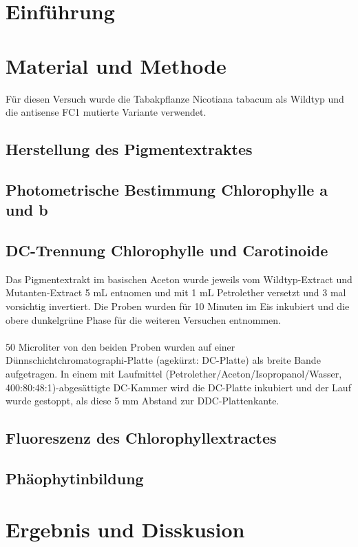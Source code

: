 \documentclass[10pt,a4paper]{article}
\begin{document}
	
	\section{Einführung}
	

	
	\section{Material und Methode}
	Für diesen Versuch wurde die Tabakpflanze Nicotiana tabacum als Wildtyp und die antisense FC1 mutierte Variante verwendet.
		\subsection{Herstellung des Pigmentextraktes}
		\subsection{Photometrische Bestimmung Chlorophylle a und b}
		\subsection{DC-Trennung Chlorophylle und Carotinoide}
		Das Pigmentextrakt im basischen Aceton wurde jeweils vom Wildtyp-Extract und Mutanten-Extract 5 mL entnomen und mit 1 mL Petrolether versetzt und 3 mal vorsichtig invertiert.
		Die Proben wurden für 10 Minuten im Eis inkubiert und die obere dunkelgrüne Phase für die weiteren Versuchen entnommen.\\
		\\
		50 Microliter von den beiden Proben wurden auf einer Dünnschichtchromatographi-Platte (agekürzt: DC-Platte) als breite Bande aufgetragen.
		In einem mit Laufmittel (Petrolether/Aceton/Isopropanol/Wasser, 400:80:48:1)-abgesättigte DC-Kammer wird die DC-Platte inkubiert und der Lauf wurde gestoppt, als diese 5 mm Abstand zur DDC-Plattenkante.
		\subsection{Fluoreszenz des Chlorophyllextractes}
		\subsection{Phäophytinbildung}
	
	\section{Ergebnis und Disskusion}


	
\end{document}
